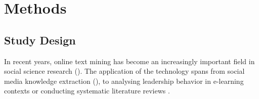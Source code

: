 







\section{Methods}\label{Methods}
\subsection{Study Design}\label{Study Design}
In recent years, online text mining has become an increasingly important field in social science research (\cites[37]{Ignatow2018}{Shumate2016}). The application of the technology spans from social media knowledge extraction (\cite{A.Salloumetal.2017}), to analysing leadership behavior in e-learning contexts \parencite{Xie2018} or conducting systematic literature reviews \parencite{Mergel2018}. 

